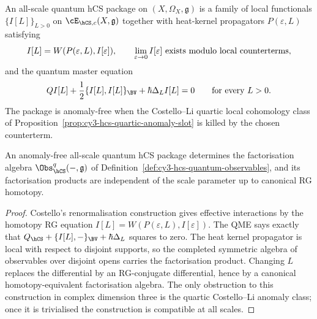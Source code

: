 \begin{definition}
\label{def:all-scale-quantum-hcs-package}
An all-scale quantum hCS package on $(X,\Omega_X,\mathfrak g)$ is a
family of local functionals $\{I[L]\}_{L>0}$ on
$\cE_{\hCS,c}(X,\mathfrak g)$ together with heat-kernel propagators
$P(\varepsilon,L)$ satisfying
\[
 I[L]=W(P(\varepsilon,L),I[\varepsilon]),
 \qquad
 \lim_{\varepsilon\to0} I[\varepsilon]\ \textup{exists modulo local
 counterterms},
\]
and the quantum master equation
\[
 QI[L]+\frac12\{I[L],I[L]\}_{\BV}+\hbar\Delta_L I[L]=0
 \qquad \textup{for every }L>0.
\]
The package is anomaly-free when the Costello--Li quartic local
cohomology class of Proposition~\ref{prop:cy3-hcs-quartic-anomaly-slot}
is killed by the chosen counterterm.
\end{definition}

\begin{proposition}
\label{prop:qme-factorisation-compatibility}
An anomaly-free all-scale quantum hCS package determines the
factorisation algebra $\Obs_{\hCS}^{q}(-,\mathfrak g)$ of
Definition~\ref{def:cy3-hcs-quantum-observables}, and its
factorisation products are independent of the scale parameter up to
canonical RG homotopy.
\end{proposition}

\begin{proof}
Costello's renormalisation construction gives effective interactions by
the homotopy RG equation $I[L]=W(P(\varepsilon,L),I[\varepsilon])$.
The QME says exactly that
$Q_{\hCS}+\{I[L],-\}_{\BV}+\hbar\Delta_L$ squares to zero. The heat
kernel propagator is local with respect to disjoint supports, so the
completed symmetric algebra of observables over disjoint opens carries
the factorisation product. Changing $L$ replaces the differential by
an RG-conjugate differential, hence by a canonical homotopy-equivalent
factorisation algebra. The only obstruction to this construction in
complex dimension three is the quartic Costello--Li anomaly class; once
it is trivialised the construction is compatible at all scales.
\end{proof}

